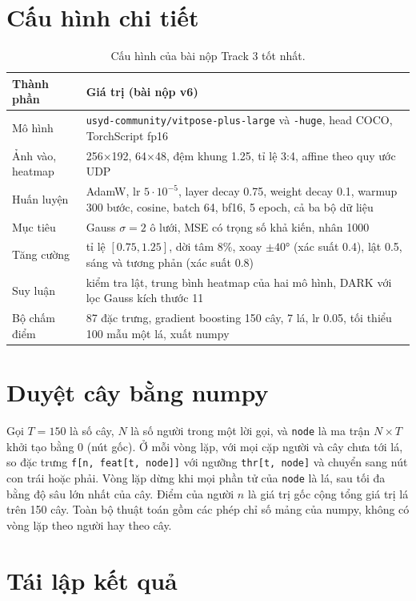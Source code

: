 \documentclass[11pt,a4paper]{article}
\begin{document}
\appendix
\section{Cấu hình chi tiết}

\begin{table}[H]
\centering\small
\begin{tabularx}{\linewidth}{@{}lX@{}}
\toprule
Thành phần & Giá trị (bài nộp v6) \\
\midrule
Mô hình & \texttt{usyd-community/vitpose-plus-large} và \texttt{-huge}, head COCO, TorchScript fp16 \\
Ảnh vào, heatmap & 256×192, 64×48, đệm khung 1.25, tỉ lệ 3:4, affine theo quy ước UDP \\
Huấn luyện & AdamW, lr $5\cdot10^{-5}$, layer decay 0.75, weight decay 0.1, warmup 300 bước, cosine, batch 64, bf16, 5 epoch, cả ba bộ dữ liệu \\
Mục tiêu & Gauss $\sigma=2$ ô lưới, MSE có trọng số khả kiến, nhân 1000 \\
Tăng cường & tỉ lệ $[0.75,1.25]$, dời tâm 8\%, xoay $\pm40°$ (xác suất 0.4), lật 0.5, sáng và tương phản (xác suất 0.8) \\
Suy luận & kiểm tra lật, trung bình heatmap của hai mô hình, DARK với lọc Gauss kích thước 11 \\
Bộ chấm điểm & 87 đặc trưng, gradient boosting 150 cây, 7 lá, lr 0.05, tối thiểu 100 mẫu một lá, xuất numpy \\
\bottomrule
\end{tabularx}
\caption{Cấu hình của bài nộp Track 3 tốt nhất.}
\end{table}

\section{Duyệt cây bằng numpy}

Gọi $T=150$ là số cây, $N$ là số người trong một lời gọi, và \texttt{node} là ma trận $N\times T$ khởi tạo bằng 0 (nút gốc). Ở mỗi vòng lặp, với mọi cặp người và cây chưa tới lá, so đặc trưng \texttt{f[n, feat[t, node]]} với ngưỡng \texttt{thr[t, node]} và chuyển sang nút con trái hoặc phải. Vòng lặp dừng khi mọi phần tử của \texttt{node} là lá, sau tối đa bằng độ sâu lớn nhất của cây. Điểm của người $n$ là giá trị gốc cộng tổng giá trị lá trên 150 cây. Toàn bộ thuật toán gồm các phép chỉ số mảng của numpy, không có vòng lặp theo người hay theo cây.


\section{Tái lập kết quả}
\end{document}
